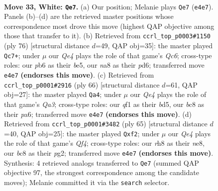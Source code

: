 \documentclass[11pt]{article}
\begin{document}
\clearpage

\begin{figure}[p]\centering
\begin{subfigure}{0.46\textwidth}\centering
\resizebox{\linewidth}{!}{%
\newchessgame
\chessboard[
  setfen={n1b4r/8/1p5k/6p1/4Q2p/P2P1P2/7K/4Nq2 w - - 0 33},
  showmover=false,
  pgfstyle=straightmove, color=movearrow, markmove={e4-e7}
]}
\caption{}
\end{subfigure}\hfill
\begin{subfigure}{0.46\textwidth}\centering
\resizebox{\linewidth}{!}{%
\newchessgame
\chessboard[
  setfen={8/k6p/2Qp4/3Pb3/2P5/1q2P3/2N4p/7K w - - 4 39},
  showmover=false,
  pgfstyle=straightmove, color=movearrow, markmove={c6-c7}
]}
\caption{}
\end{subfigure}
\\[4pt]
\begin{subfigure}{0.46\textwidth}\centering
\resizebox{\linewidth}{!}{%
\newchessgame
\chessboard[
  setfen={6k1/7p/p3P1p1/3bq3/3N4/Q4P1P/6P1/6K1 w - - 1 34},
  showmover=false,
  pgfstyle=straightmove, color=movearrow, markmove={a3-a4}
]}
\caption{}
\end{subfigure}\hfill
\begin{subfigure}{0.46\textwidth}\centering
\resizebox{\linewidth}{!}{%
\newchessgame
\chessboard[
  setfen={4N3/1Q5p/p1n3p1/4pq2/P6k/8/5PPK/8 b - - 0 33},
  showmover=false,
  pgfstyle=straightmove, color=movearrow, markmove={f5-f2}
]}
\caption{}
\end{subfigure}
\caption{\textbf{Move 33, White: \texttt{Qe7}.} (a) Our position; Melanie plays \texttt{Qe7} (\texttt{e4e7}). Panels (b)--(d) are the retrieved master positions whose correspondence most drove this move (highest QAP objective among those that transfer to it). (b) Retrieved from \texttt{ccrl\_top\_p0003\#1150} (ply 76) [structural distance $d$=49, QAP obj=35]: the master played \texttt{Qc7+}; under $\mu$ our \emph{Qe4} plays the role of that game's \emph{Qc6}; cross-type roles: our \emph{p}b6 as their \emph{b}e5, our \emph{n}a8 as their \emph{p}d6; transferred move \texttt{e4e7} \textbf{(endorses this move)}. (c) Retrieved from \texttt{ccrl\_top\_p0001\#2916} (ply 66) [structural distance $d$=61, QAP obj=27]: the master played \texttt{Qa4}; under $\mu$ our \emph{Qe4} plays the role of that game's \emph{Qa3}; cross-type roles: our \emph{q}f1 as their \emph{b}d5, our \emph{b}c8 as their \emph{p}a6; transferred move \texttt{e4e7} \textbf{(endorses this move)}. (d) Retrieved from \texttt{ccrl\_top\_p0001\#3482} (ply 65) [structural distance $d$=40, QAP obj=25]: the master played \texttt{Qxf2}; under $\mu$ our \emph{Qe4} plays the role of that game's \emph{Qf4}; cross-type roles: our \emph{r}h8 as their \emph{n}e8, our \emph{b}c8 as their \emph{p}g2; transferred move \texttt{e4e7} \textbf{(endorses this move)}. Synthesis: 4 retrieved analogs transferred to \texttt{Qe7} (summed QAP objective 97, the strongest correspondence among the candidate moves); Melanie committed it via the \texttt{search} selector.}
\label{fig:thought-m64}
\end{figure}
\end{document}
